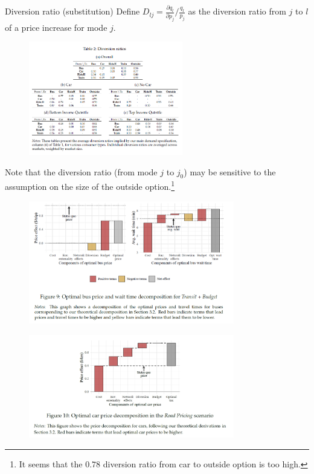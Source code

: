 \documentclass[10pt, aspectratio=169]{beamer}
\begin{document}
\begin{frame}{Diversion ratio (substitution)}
  Define $D_{lj} = \frac{\partial q_l}{\partial p_j} / \frac{q_l}{p_j}$ as the diversion ratio from $j$ to $l$ of a price
  increase for mode $j$.
  \begin{figure}
    \centering
    \includegraphics[width=0.6\textwidth]{../Figures/diversion.png}
  \end{figure}
  Note that the diversion ratio (from mode $j$ to $j_0$) may be sensitive to the assumption on the size of the outside option.\footnote{It seems that the $0.78$ diversion ratio from car to outside option is too high.}

\end{frame}

\begin{frame}
  \begin{figure}
    \centering
    \includegraphics[width=0.8\textwidth]{../Figures/transit_budget.png}
  \end{figure}
\end{frame}

\begin{frame}
  \begin{figure}
    \centering
    \includegraphics[width=0.8\textwidth]{../Figures/road_budget.png}
  \end{figure}
\end{frame}
\end{document}
